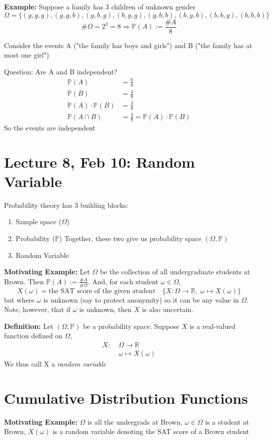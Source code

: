 \documentclass[12pt]{article}
\renewcommand{\P}{\mathbb{P}}
\begin{document}
\textbf{Example:} Suppose a family has 3 children of unknown gender 
\[\Omega = \{(g, g, g), (g, g, b), (g, b, g), (b, g, g), (g, b, b), (b, g, b), (b, b, g), (b, b, b)\}\]
\[\#\Omega = 2^3 = 8 \Longrightarrow \P(A) := \frac{\#A}{8}\]

Consider the events A ("the family has boys and girls") and B ("the family has at most one girl")

Question: Are A and B independent?
\begin{align*}
    \P(A) &= \frac{6}{8}\\
    \P(B) &= \frac{4}{8}\\
    \P(A) \cdot \P(B) &= \frac{3}{8}\\
    \P(A \cap B) &= \frac{3}{8} = \P(A) \cdot \P(B) 
\end{align*}
So the events are independent 

\section{Lecture 8, Feb 10: Random Variable}
Probability theory has 3 building blocks:
\begin{enumerate}
    \item Sample space ($\Omega$)
    \item Probability ($\P$)
    Together, these two give us probability space $(\Omega, \P)$
    \item Random Variable
\end{enumerate}

\textbf{Motivating Example:}
Let $\Omega$ be the collection of all undergraduate students at Brown. Then $\P(A) := \frac{\#A}{\#\Omega}$. 
And, for each student $\omega \in \Omega$, 
\[X(\omega) = \text{the SAT score of the given student} \quad \{X: \Omega \to \mathbb{R},\; \omega \mapsto X(\omega)\}\]
but where $\omega$ is unknown (say to protect anonymity) so it can be any value in $\Omega$. 
Note, however, that if $\omega$ is unknown, then $X$ is also uncertain.

\textbf{Definition:}
Let $(\Omega, \P)$ be a probability space. Suppose $X$ is a real-valued function defined on $\Omega$, 
\begin{align*}
    X: \; &\Omega \to \mathbb{R}\\
    &\omega \mapsto X(\omega)
\end{align*}
We thus call X a \emph{random variable}

\section{Cumulative Distribution Functions}
\textbf{Motivating Example:} $\Omega$ is all the undergrads at Brown, $\omega \in \Omega$ is a student at Brown, $X(\omega)$ is a random variable denoting the SAT score of a Brown student 
\end{document}
